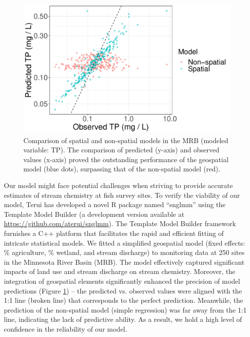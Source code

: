 \documentclass[12pt, class=article, crop=false]{standalone}
\begin{document}
\begin{figure}
    \includegraphics[scale=0.35]{output/fig_tpfit.pdf}
    \caption{Comparison of spatial and non-spatial models in the MRB (modeled variable: TP). The comparison of predicted (y-axis) and observed values (x-axis) proved the outstanding performance of the geospatial model (blue dots), surpassing that of the non-spatial model (red).}
    \label{fig:tpfit}
\end{figure}

Our model might face potential challenges when striving to provide accurate estimates of stream chemistry at fish survey sites. To verify the viability of our model, Terui has developed a novel R package named ``snglmm'' using the Template Model Builder (a development version available at \url{https://github.com/aterui/snglmm}). The Template Model Builder framework furnishes a C++ platform that facilitates the rapid and efficient fitting of intricate statistical models.
We fitted a simplified geospatial model (fixed effects: \% agriculture, \% wetland, and stream discharge) to monitoring data at 250 sites in the Minnesota River Basin (MRB). The model effectively captured significant impacts of land use and stream discharge on stream chemistry. Moreover, the integration of geospatial elements significantly enhanced the precision of model predictions (Figure \ref{fig:tpfit}) -- the predicted vs. observed values were aligned with the 1:1 line (broken line) that corresponds to the perfect prediction. Meanwhile, the prediction of the non-spatial model (simple regression) was far away from the 1:1 line, indicating the lack of predictive ability. As a result, we hold a high level of confidence in the reliability of our model.
\end{document}
